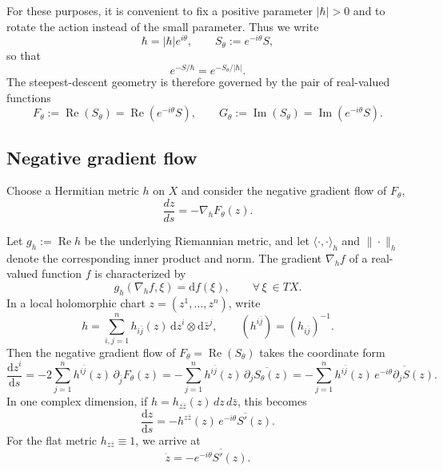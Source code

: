 \documentclass[11pt]{amsart}
\theoremstyle{plain}
\newcommand{\dd}{\mathrm d}
\newcommand{\re}{\operatorname{Re}}
\newcommand{\im}{\operatorname{Im}}
\begin{document}
For these purposes, it is convenient to fix a positive parameter \(|\hbar|>0\) and to rotate the action instead of the small parameter. Thus we write
\begin{equation*}
\hbar=|\hbar|e^{i\theta},
\qquad
S_\theta:=e^{-i\theta}S,
\end{equation*}
so that
\begin{equation*}
e^{-S/\hbar}=e^{-S_\theta/|\hbar|}.
\end{equation*}
The steepest-descent geometry is therefore governed by the pair of real-valued functions
\begin{equation*}\label{eq:Ftheta-Gtheta-general}
F_\theta:=\re(S_\theta)=\re(e^{-i\theta}S),
\qquad
G_\theta:=\im(S_\theta)=\im(e^{-i\theta}S).
\end{equation*}

\smallskip
\subsection{Negative gradient flow}

Choose a Hermitian metric $h$ on \(X\) and consider the negative gradient flow of \(F_\theta\),
\begin{equation}\label{eq:negative-gradient-flow-general}
\frac{dz}{ds}=-\nabla_h F_\theta(z).
\end{equation}

Let $g_h:=\operatorname{Re}h$ be the underlying Riemannian metric, and let $\langle\cdot,\cdot\rangle_h$ and $\|\cdot\|_h$ denote the corresponding inner product and norm.  The gradient $\nabla_h f$ of a real-valued function $f$ is characterized by
\[
g_h(\nabla_h f,\xi)=\dd f(\xi),\qquad \forall\,\xi~\in TX.
\]
In a local holomorphic chart $z=(z^1,\dots,z^n)$, write
\[
h=\sum_{i,j=1}^n h_{i\bar j}(z)\,\dd z^i\otimes \dd\bar z^j,
\qquad
(h^{i\bar j})=(h_{i\bar j})^{-1}.
\]
Then the negative gradient flow of $F_\theta=\operatorname{Re}(S_\theta)$ takes the coordinate form
\begin{equation}\label{eq:complex-gradient-standard}
\frac{\dd z^i}{\dd s}
=-2\sum_{j=1}^n h^{i\bar j}(z)\,\partial_{\bar j}F_\theta(z)
=-\sum_{j=1}^n h^{i\bar j}(z)\,\overline{\partial_j S_\theta(z)}
=-\sum_{j=1}^n h^{i\bar j}(z)\,\overline{e^{-i\theta}\partial_j S(z)}.
\end{equation}
In one complex dimension, if $h=h_{z\bar z}(z)\,dz\,d\bar z$, this becomes
\[
\frac{\dd z}{\dd s}=-h^{z\bar z}(z)\,\overline{e^{-i\theta}S'(z)}.
\]
For the flat metric $h_{z\bar z}\equiv 1$, we arrive at  \[\dot z=-\overline{e^{-i\theta}S'(z)}.\]
\end{document}
